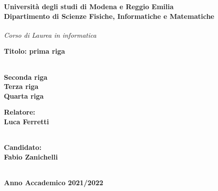 \documentclass[12pt,a4paper,oneside,onecolumn,openright]{book}
\begin{document}
\begin{titlepage}
\begin{center}
{
    \large
    \textbf{Università  degli studi di Modena e Reggio Emilia} \\
   	\textbf{Dipartimento di Scienze Fisiche, Informatiche e Matematiche} \\
    \hspace*{0cm} \hrulefill \hspace*{0cm} \\
   	\emph{Corso di Laurea in informatica}
    
  
  
 		\huge{\bf Titolo: prima riga }}\\
		\vspace{3mm}
		{\huge{\bf Seconda riga}}\\
		\vspace{3mm}
		\vspace{3mm}
		{\huge{\bf Terza riga}}\\
		\vspace{3mm}
		\vspace{3mm}
		{\huge{\bf Quarta riga}}\\
		
		\end{center}
		
\vspace{40mm}
\par
\noindent
\begin{minipage}[t]{0.47\textwidth}
{\large{\bf Relatore:\\
Luca Ferretti}}\\ 
\\

\end{minipage}
\hfill
\begin{minipage}[t]{0.47\textwidth}\raggedleft
{\large{\bf Candidato:\\
Fabio Zanichelli}}
\end{minipage}
\vspace{20mm}
\begin{center}
\hspace*{0cm} \hrulefill \hspace*{0cm} \\
{\large{\bf 
Anno Accademico 2021/2022}}
\end{center}

\end{titlepage}
\end{document}
